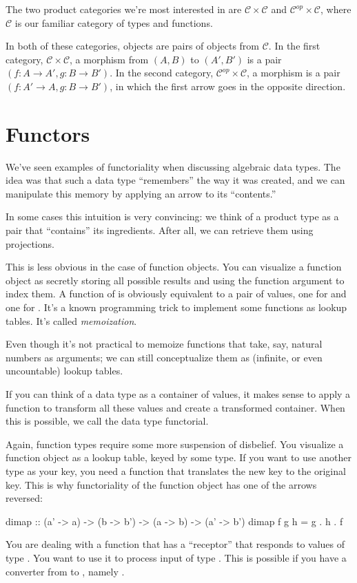 \documentclass[DaoFP]{subfiles}
\begin{document}
The two product categories we're most interested in are $\mathcal{C} \times \mathcal{C}$ and $\mathcal{C}^{op} \times \mathcal{C}$, where $\mathcal{C}$ is our familiar category of types and functions.

In both of these categories, objects are pairs of objects from $\mathcal{C}$. In the first category, $\mathcal{C} \times \mathcal{C}$, a morphism from $(A, B)$ to $(A', B')$ is a pair $(f \colon A \to A', g \colon B \to B')$. In the second category, $\mathcal{C}^{op} \times \mathcal{C}$, a morphism is a pair $(f \colon A' \to A, g \colon B \to B')$, in which the first arrow goes in the opposite direction.

\section{Functors}

We've seen examples of functoriality when discussing algebraic data types. The idea was that such a data type 	``remembers'' the way it was created, and we can manipulate this memory by applying an arrow to its ``contents.'' 

In some cases this intuition is very convincing: we think of a product type as a pair that ``contains'' its ingredients. After all, we can retrieve them using projections. 

This is less obvious in the case of function objects. You can visualize a function object as secretly storing all possible results and using the function argument to index them. A function of  is obviously equivalent to a pair of values, one for  and one for . It's a known programming trick to implement some functions as lookup tables. It's called \emph{memoization}. 

Even though it's not practical to memoize functions that take, say, natural numbers as arguments; we can still conceptualize them as (infinite, or even uncountable) lookup tables.

If you can think of a data type as a container of values, it makes sense to apply a function to transform all these values and create a transformed container. When this is possible, we call the data type functorial. 

Again, function types require some more suspension of disbelief. You visualize a function object as a lookup table, keyed by some type. If you want to use another type as your key, you need a function that translates the new key to the original key. This is why functoriality of the function object has one of the arrows reversed:
\begin{haskell}
dimap :: (a' -> a) -> (b -> b') -> (a -> b) -> (a' -> b')
dimap f g h = g . h . f
\end{haskell}
You are dealing with a function  that has a ``receptor'' that responds to values of type . You want to use it to process input of type . This is possible if you have a converter from  to , namely .
\end{document}
